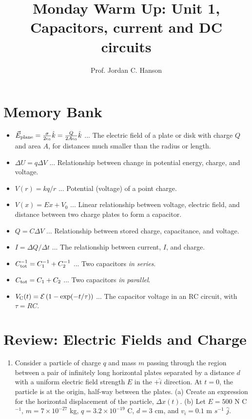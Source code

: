 \documentclass{article}
\begin{document}
\twocolumn

\title{Monday Warm Up: Unit 1, Capacitors, current and DC circuits}
\author{Prof. Jordan C. Hanson}

\maketitle

\section{Memory Bank}

\begin{itemize}
\item $\vec{E}_{\rm plane} = \frac{\sigma}{2\epsilon_0}\hat{k} = \frac{Q}{2A\epsilon_0}\hat{k}$ ... The electric field of a plate or disk with charge $Q$ and area $A$, for distances much smaller than the radius or length.
\item $\Delta U = q\Delta V$ ... Relationship between change in potential energy, charge, and voltage.
\item $V(r) = k q / r$ ... Potential (voltage) of a point charge.
\item $V(x) = E x + V_0$ ... Linear relationship between voltage, electric field, and distance between two charge plates to form a capacitor.
\item $Q = C\Delta V$ ... Relationship between stored charge, capacitance, and voltage.
\item $I = \Delta Q / \Delta t$ ... The relationship between current, $I$, and charge.
\item $C_{\rm tot}^{-1} = C_1^{-1} + C_2^{-1}$ ... Two capacitors \textit{in series}.
\item $C_{\rm tot} = C_1 + C_2$ ... Two capacitors \textit{in parallel}.
\item $V_{\rm C}(t) = \mathcal{E}\left(1 - \exp(-t/\tau)\right)$ ... The capacitor voltage in an RC circuit, with $\tau = RC$.
\end{itemize}

\section{Review: Electric Fields and Charge}

\begin{enumerate}
\item Consider a particle of charge $q$ and mass $m$ passing through the region between a pair of infinitely long horizontal plates separated by a distance $d$ with a uniform electric field strength $E$ in the $+\hat{i}$ direction. At $t=0$, the particle is at the origin, half-way between the plates.  (a) Create an expression for the horizontal displacement of the particle, $\Delta x(t)$.  (b) Let $E = 500$ N C$^{-1}$, $m = 7\times 10^{-27}$ kg, $q = 3.2 \times 10^{-19}$ C, $d = 3$ cm, and $v_i = 0.1$ m $s^{-1}$ $\hat{j}$. \\ \vspace{4cm}
\end{enumerate}
\end{document}

